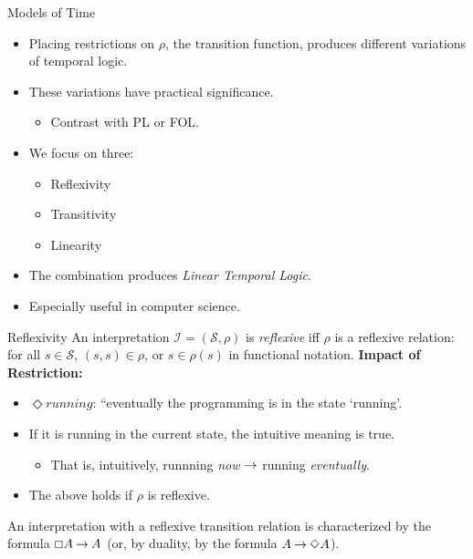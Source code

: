 \documentclass[style=sailor,size=12pt,mode=present]{powerdot}
\theoremstyle{definition}
\newenvironment{defn}[1]
  {\renewcommand\theinnerdefn{#1}\innerdefn}
  {\endinnerdefn}
\newenvironment{thm}[1]
  {\renewcommand\theinnerthm{#1}\innerthm}
  {\endinnerthm}
\begin{document}
\begin{wideslide}[bm=,toc=]{Models of Time}
\begin{itemize}
\item Placing restrictions on $\rho$, the transition function, produces
different variations of temporal logic.
\item These variations have practical significance.
\begin{itemize}
\item Contrast with PL or FOL.
\end{itemize}
\item We focus on three:
\begin{itemize}
\item Reflexivity
\item Transitivity
\item Linearity
\end{itemize}
\item The combination produces \emph{Linear Temporal Logic}.
\item Especially useful in computer science.
\end{itemize}
\end{wideslide}


\begin{wideslide}[bm=,toc=]{Reflexivity}
\begin{defn}{13.16}[Ben Ari]
An interpretation $\mathcal{I} = (\mathcal{S},\rho)$ is \emph{reflexive}
iff $\rho$ is a reflexive relation: for all $s \in \mathcal{S}$, $(s,s) \in
\rho$, or $s \in \rho(s)$ in functional notation.
\end{defn}
{\bf Impact of Restriction:}
\begin{itemize}
\item $\Diamond running$: ``eventually the programming is in the state
`running'.
\item If it is running in the current state, the intuitive meaning is true.
\begin{itemize}
\item That is, intuitively, runnning \emph{now} $\mathbin{\rightarrow}$ running \emph{eventually}.
\end{itemize}
\item The above holds if $\rho$ is reflexive.
\end{itemize}
\begin{thm}{13.17}
An interpretation with a reflexive transition relation is characterized by the
formula $\Box A \mathbin{\rightarrow} A$ (or, by duality, by the formula $A \mathbin{\rightarrow} \Diamond A$).
\end{thm}
\end{wideslide}
\end{document}
